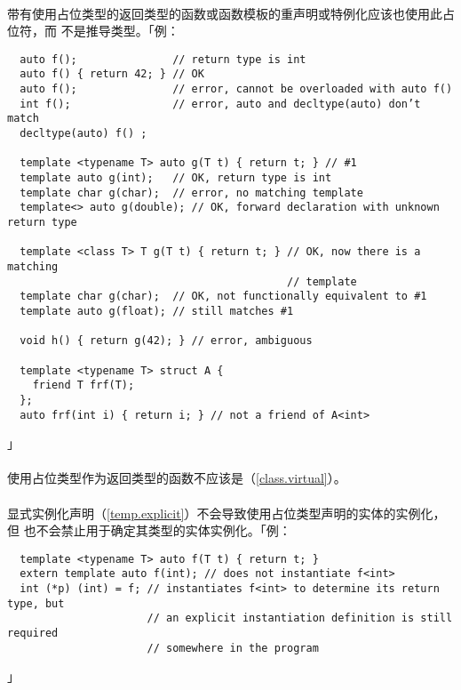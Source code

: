 \paragraph{}
带有使用占位类型的返回类型的函数或函数模板的重声明或特例化应该也使用此占位符，而
不是推导类型。「例：
\begin{lstlisting}
  auto f();               // return type is int
  auto f() { return 42; } // OK
  auto f();               // error, cannot be overloaded with auto f()
  int f();                // error, auto and decltype(auto) don’t match
  decltype(auto) f() ;

  template <typename T> auto g(T t) { return t; } // #1
  template auto g(int);   // OK, return type is int
  template char g(char);  // error, no matching template
  template<> auto g(double); // OK, forward declaration with unknown return type

  template <class T> T g(T t) { return t; } // OK, now there is a matching
                                            // template
  template char g(char);  // OK, not functionally equivalent to #1
  template auto g(float); // still matches #1

  void h() { return g(42); } // error, ambiguous

  template <typename T> struct A {
    friend T frf(T);
  };
  auto frf(int i) { return i; } // not a friend of A<int>
\end{lstlisting}」

\paragraph{}
使用占位类型作为返回类型的函数不应该是（\ref{class.virtual}）。

\paragraph{}
显式实例化声明（\ref{temp.explicit}）不会导致使用占位类型声明的实体的实例化，但
也不会禁止用于确定其类型的实体实例化。「例：
\begin{lstlisting}
  template <typename T> auto f(T t) { return t; }
  extern template auto f(int); // does not instantiate f<int>
  int (*p) (int) = f; // instantiates f<int> to determine its return type, but
                      // an explicit instantiation definition is still required
                      // somewhere in the program
\end{lstlisting}」

